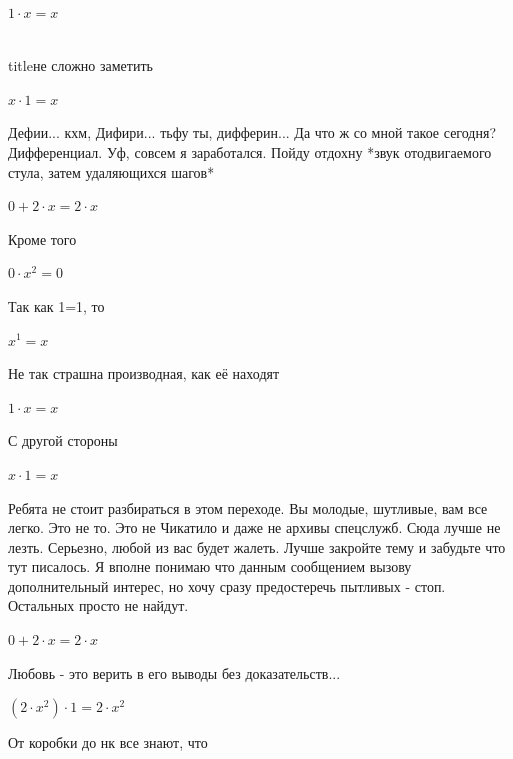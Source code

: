 \documentclass[12pt,a4paper,fleqn]{article}
\begin{document}
\begin{center}
$1 \cdot x = x$\end{center}
\\ title{не сложно заметить} 

\begin{center}
$x \cdot 1 = x$\end{center}
Дефии... кхм, Дифири... тьфу ты, дифферин... Да что ж со мной такое сегодня? Дифференциал. Уф, совсем я заработался. Пойду отдохну *звук отодвигаемого стула, затем удаляющихся шагов*

\begin{center}
$0+2 \cdot x = 2 \cdot x$\end{center}
Кроме того

\begin{center}
$0 \cdot x^{2} = 0$\end{center}
Так как 1=1, то\cite{link4}

\begin{center}
$x^{1} = x$\end{center}
Не так страшна производная, как её находят\cite{link2}

\begin{center}
$1 \cdot x = x$\end{center}
С другой стороны

\begin{center}
$x \cdot 1 = x$\end{center}
Ребята не стоит разбираться в этом переходе. Вы молодые, шутливые, вам все легко. Это не то. Это не Чикатило и даже не архивы спецслужб. Сюда лучше не лезть. Серьезно, любой из вас будет жалеть. Лучше закройте тему и забудьте что тут писалось. Я вполне понимаю что данным сообщением вызову дополнительный интерес, но хочу сразу предостеречь пытливых - стоп. Остальных просто не найдут.

\begin{center}
$0+2 \cdot x = 2 \cdot x$\end{center}
Любовь - это верить в его выводы без доказательств...

\begin{center}
$(2 \cdot x^{2}) \cdot 1 = 2 \cdot x^{2}$\end{center}
От коробки до нк все знают, что
\end{document}
